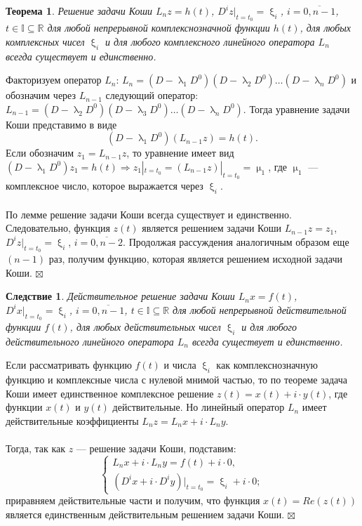 \documentclass[a4paper, 12pt]{report}
\newenvironment{Proof} %
{\par\noindent{$\blacklozenge$}} %
{\hfill$\scriptstyle\boxtimes$}
\renewcommand{\lambda}{\uplambda}
\renewcommand{\mu}{\upmu}
\renewcommand{\xi}{\upxi}
\begin{document}
	\newtheorem*{2_1_2}{Теорема}\begin{2_1_2} Решение задачи Коши $L_nz = h(t)$, $D^iz|_{t=t_0} = \xi_i$, $i=\overline{0,n-1}$, $t\in\mathbb{I}\subseteq\mathbb{R}$ для любой непрерывной комплекснозначной функции $h(t)$, для любых комплексных чисел $\xi_i$ и для любого комплексного линейного оператора $L_n$ всегда существует и единственно.
	\end{2_1_2}\begin{Proof}
		Факторизуем оператор $L_n$: $L_n = (D-\lambda_1D^0)(D-\lambda_2D^0)\ldots(D-\lambda_nD^0)$ и обозначим через $L_{n-1}$ следующий оператор: $L_{n-1} = (D-\lambda_2D^0)(D-\lambda_3D^0)\ldots(D-\lambda_nD^0)$. Тогда уравнение задачи Коши представимо в виде $$(D-\lambda_1D^0)(L_{n-1}z) = h(t).$$
		Если обозначим $z_1=L_{n-1}z$, то уравнение имеет вид $(D - \lambda_1D^0)z_1 = h(t)\Rightarrow z_1|_{t=t_0}=(L_{n-1}z)|_{t=t_0} = \mu_1$, где $\mu_1$ --- комплексное число, которое выражается через $\xi_i$.\\\\
		По лемме решение задачи Коши всегда существует и единственно. Следовательно, функция $z(t)$ является решением задачи Коши $L_{n-1}z = z_1$, $D^iz|_{t=t_0} = \xi_i$, $i=\overline{0,n-2}$. Продолжая рассуждения аналогичным образом еще $(n-1)$ раз, получим функцию, которая является решением исходной задачи Коши.
	\end{Proof}
	\newtheorem*{2_1_3}{Следствие}\begin{2_1_3} Действительное решение задачи Коши $L_nx = f(t)$, $D^ix|_{t=t_0} = \xi_i$, $i=\overline{0,n-1}$, $t\in\mathbb{I}\subseteq\mathbb{R}$ для любой непрерывной действительной функции $f(t)$, для любых действительных чисел $\xi_i$ и для любого действительного линейного оператора $L_n$ всегда существует и единственно.
	\end{2_1_3}\begin{Proof}
		Если рассматривать функцию $f(t)$ и числа $\xi_i$ как комплекснозначную функцию и комплексные числа с нулевой мнимой частью, то по теореме задача Коши имеет единственное комплексное решение $z(t) = x(t) + i\cdot y(t)$, где функции $x(t)$ и $y(t)$ действительные. Но линейный оператор $L_n$ имеет действительные коэффициенты $L_nz = L_nx + i\cdot L_ny$.\\\\
		Тогда, так как $z$ --- решение задачи Коши, подставим: $$\begin{cases}
			L_nx + i\cdot L_ny = f(t) + i\cdot 0,\\
			(D^ix + i\cdot D^iy)|_{t=t_0} = \xi_i + i\cdot 0;
		\end{cases}$$ приравняем действительные части и получим, что функция $x(t) = Re(z(t))$ является единственным действительным решением задачи Коши.
	\end{Proof}
\end{document}

